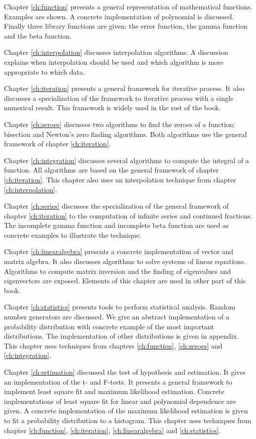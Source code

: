 Chapter \ref{ch:function} presents a general representation of
mathematical functions. Examples are shown. A concrete
implementation of polynomial is discussed. Finally three library
functions are given: the error function, the gamma function and
the beta function.

Chapter \ref{ch:interpolation} discusses interpolation algorithms.
A discussion explains when interpolation should be used and which
algorithm is more appropriate to which data.

Chapter \ref{ch:iteration} presents a general framework for
iterative process. It also discusses a specialization of the
framework to iterative process with a single numerical result.
This framework is widely used in the rest of the book.

Chapter \ref{ch:zeroes} discusses two algorithms to find the
zeroes of a function: bisection and Newton's zero finding
algorithms. Both algorithms use the general framework of chapter
\ref{ch:iteration}.

Chapter \ref{ch:integration} discusses several algorithms to
compute the integral of a function. All algorithms are based on
the general framework of chapter \ref{ch:iteration}. This chapter
also uses an interpolation technique from chapter
\ref{ch:interpolation}.

Chapter \ref{ch:series} discusses the specialization of the
general framework of chapter \ref{ch:iteration} to the computation
of infinite series and continued fractions. The incomplete gamma
function and incomplete beta function are used as concrete
examples to illustrate the technique.

Chapter \ref{ch:linearalgebra} presents a concrete implementation
of vector and matrix algebra. It also discusses algorithms to
solve systems of linear equations. Algorithms to compute matrix
inversion and the finding of eigenvalues and eigenvectors are
exposed. Elements of this chapter are used in other part of this
book.

Chapter \ref{ch:statistics} presents tools to perform statistical
analysis. Random number generators are discussed. We give an
abstract implementation of a probability distribution with
concrete example of the most important distributions. The
implementation of other distributions is given in appendix. This
chapter uses techniques from chapters \ref{ch:function},
\ref{ch:zeroes} and \ref{ch:integration}.

Chapter \ref{ch:estimation} discussed the test of hypothesis and
estimation. It gives an implementation of the t- and F-tests. It
presents a general framework to implement least square fit and
maximum likelihood estimation. Concrete implementations of least
square fit for linear and polynomial dependence are given. A
concrete implementation of the maximum likelihood estimation is
given to fit a probability distribution to a histogram. This
chapter uses techniques from chapter \ref{ch:function},
\ref{ch:iteration}, \ref{ch:linearalgebra} and
\ref{ch:statistics}.

